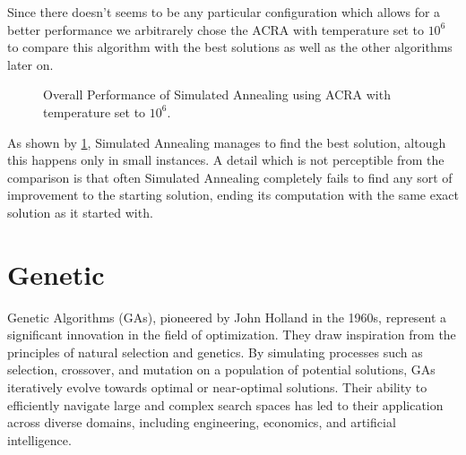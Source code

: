 Since there doesn't seems to be any particular configuration which allows for a better performance we arbitrarely chose the ACRA with temperature set to $10^6$ to compare this algorithm with the best solutions as well as the other algorithms later on.

\begin{figure}[htbp]
	\centering
	\caption{Overall Performance of Simulated Annealing using ACRA with temperature set to $10^6$.}
    \label{fig:annealingCost}
\end{figure}

As shown by \figurename{ \ref{fig:annealingCost}}, Simulated Annealing manages to find the best solution, altough this happens only in small instances.
A detail which is not perceptible from the comparison is that often Simulated Annealing completely fails to find any sort of improvement to the starting solution, ending its computation with the same exact solution as it started with.

\newpage

\section{Genetic}

Genetic Algorithms (GAs), pioneered by John Holland in the 1960s, represent a significant innovation in the field of optimization.
They draw inspiration from the principles of natural selection and genetics.
By simulating processes such as selection, crossover, and mutation on a population of potential solutions, GAs iteratively evolve towards optimal or near-optimal solutions.
Their ability to efficiently navigate large and complex search spaces has led to their application across diverse domains, including engineering, economics, and artificial intelligence.

